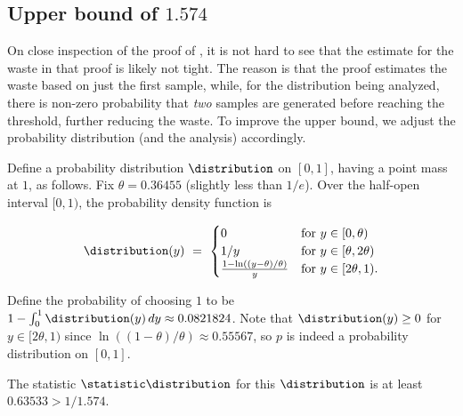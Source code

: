 \subsection{Upper bound of \texorpdfstring{$1.574$}{1.574}}

On close inspection of the proof of , 
it is not hard to see that the estimate for the waste in that proof is likely not tight. 
The reason is that the proof estimates the waste based on just the first sample, 
while, for the distribution being analyzed,
there is non-zero probability that {\em two} samples
are generated before reaching the threshold, further reducing the waste.
To improve the upper bound,
we adjust the probability distribution (and the analysis) accordingly.

Define a probability distribution $\distribution$ on $[0,1]$, having a point mass at $1$, as follows.
Fix $\theta = 0.36455$ (slightly less than $1/e$).
Over the half-open interval $[0,1)$, the probability density function is

\[
\distribution(y) ~=~
\begin{cases}
  0                  
  & \text{for } y \in [0,\theta) 
  \\
  1/y
  & \text{for } y \in [\theta,2\theta) 
  \\
  \frac{1-\ln((y-\theta)/\theta)}{y}
  & \text{for } y \in [2\theta, 1).
\end{cases}
\]

Define the probability of choosing $1$ to be $1-\int_0^1 \distribution(y) \,dy \approx 0.0821824$.
Note that $\distribution(y)\ge 0$ for $y\in [2\theta,1)$ since $\ln((1-\theta)/\theta)\approx 0.55567$,
so $p$ is indeed a probability distribution on $[0,1]$.



\begin{lemma}\label{lemma: upper bound 2}
  The statistic $\statistic \distribution$ for this $\distribution$ is at least $0.63533 > 1/1.574$.
\end{lemma}

